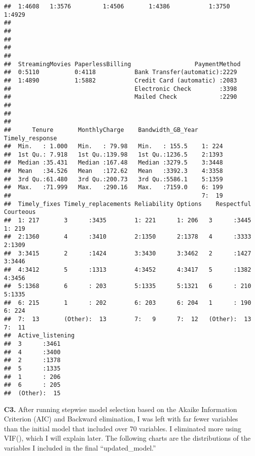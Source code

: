 \documentclass[
]{article}
\begin{document}
\begin{verbatim}
##  1:4608   1:3576         1:4506       1:4386           1:3750      1:4929     
##                                                                               
##                                                                               
##                                                                               
##                                                                               
##                                                                               
##  StreamingMovies PaperlessBilling                  PaymentMethod 
##  0:5110          0:4118           Bank Transfer(automatic):2229  
##  1:4890          1:5882           Credit Card (automatic) :2083  
##                                   Electronic Check        :3398  
##                                   Mailed Check            :2290  
##                                                                  
##                                                                  
##                                                                  
##      Tenure       MonthlyCharge    Bandwidth_GB_Year Timely_response
##  Min.   : 1.000   Min.   : 79.98   Min.   : 155.5    1: 224         
##  1st Qu.: 7.918   1st Qu.:139.98   1st Qu.:1236.5    2:1393         
##  Median :35.431   Median :167.48   Median :3279.5    3:3448         
##  Mean   :34.526   Mean   :172.62   Mean   :3392.3    4:3358         
##  3rd Qu.:61.480   3rd Qu.:200.73   3rd Qu.:5586.1    5:1359         
##  Max.   :71.999   Max.   :290.16   Max.   :7159.0    6: 199         
##                                                      7:  19         
##  Timely_fixes Timely_replacements Reliability Options    Respectful   Courteous
##  1: 217       3      :3435        1: 221      1: 206   3      :3445   1: 219   
##  2:1360       4      :3410        2:1350      2:1378   4      :3333   2:1309   
##  3:3415       2      :1424        3:3430      3:3462   2      :1427   3:3446   
##  4:3412       5      :1313        4:3452      4:3417   5      :1382   4:3456   
##  5:1368       6      : 203        5:1335      5:1321   6      : 210   5:1335   
##  6: 215       1      : 202        6: 203      6: 204   1      : 190   6: 224   
##  7:  13       (Other):  13        7:   9      7:  12   (Other):  13   7:  11   
##  Active_listening
##  3      :3461    
##  4      :3400    
##  2      :1378    
##  5      :1335    
##  1      : 206    
##  6      : 205    
##  (Other):  15
\end{verbatim}

\textbf{C3.} After running stepwise model selection based on the Akaike
Information Criterion (AIC) and Backward elimination, I was left with
far fewer variables than the initial model that included over 70
variables. I eliminated more using VIF(), which I will explain later.
The following charts are the distributions of the variables I included
in the final ``updated\_model.''
\end{document}
